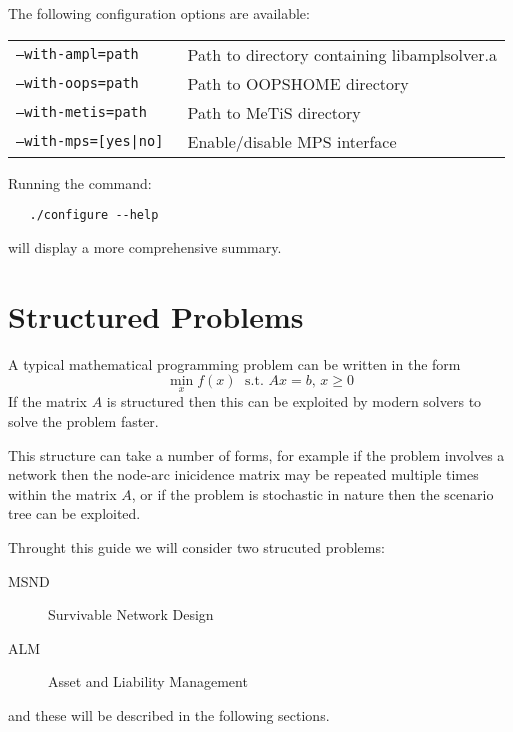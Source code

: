 \documentclass[10pt,a4paper]{book}
\begin{document}
The following configuration options are available:

\begin{tabular}{ll}
   \tt --with-ampl=path & Path to directory containing libamplsolver.a \\
   \tt --with-oops=path & Path to OOPSHOME directory \\
   \tt --with-metis=path & Path to MeTiS directory \\
   \tt --with-mps=[yes|no] & Enable/disable MPS interface
\end{tabular}

\noindent Running the command:
\begin{verbatim}
   ./configure --help
\end{verbatim}
will display a more comprehensive summary.

\chapter{Structured Problems}
\label{background}

A typical mathematical programming problem can be written in the form
\begin{equation}
\min_x f(x)\; \text{~s.t.~} Ax=b,\, x\ge 0
\end{equation}
If the matrix $A$ is structured then this can be exploited by modern solvers
to solve the problem faster.

This structure can take a number of forms, for example if the problem involves
a network then the node-arc inicidence matrix may be repeated multiple times
within the matrix $A$, or if the problem is stochastic in nature then the
scenario tree can be exploited.

Throught this guide we will consider two strucuted problems:
\begin{description}
   \item[MSND] Survivable Network Design
   \item[ALM] Asset and Liability Management
\end{description}
and these will be described in the following sections.
\end{document}
